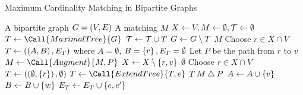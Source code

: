 \begin{algorithm}[!h]
    \caption{Maximum Cardinality Matching in Bipartite Graphs} \label{alg:max_card_match_bipartite}
    \begin{algorithmic}[1]
        \Algin A bipartite graph $G = \left( V, E \right)$
        \Algout A matching $M$ 
        \State $X \gets V, M \gets \emptyset, \mathcal{T} \gets \emptyset$ 
         \label{line:max_card_bi_while}
            \State $T \gets \Call{MaximalTree}{G}$%
            \State $\mathcal{T} \gets \mathcal{T} \cup T$%
            \State $G \gets G \setminus T$ 
        \EndWhile
        \State \Return $M$
        \Statex
            \State Choose $r \in X \cap V$ 
            \State $T \gets \left( \left( A, B \right), E_T \right)$ where $A = \emptyset$, $B = \left\{ r \right\}, E_T = \emptyset$  
                 
                    \State Let $P$ be the path from $r$ to $v$
                    \State $M \gets \Call{Augment}{M, P}$
                    \State $X \gets X \setminus \left\{ r, v \right\}$ 
                        \State \Return $\emptyset$ %
                    \Else 
                        \State Choose $r \in X \cap V$ 
                        \State $T \gets \left( \left( \emptyset, \left\{ r \right\} \right), \emptyset \right)$ 
                    \EndIf
                \Else
                    \State $T \gets \Call{ExtendTree}{T, e}$
                \EndIf
            \EndWhile
            \State \Return $T$ %
        \EndFunction
        \Statex
            \State $ M \bigtriangleup P$
        \EndProcedure
        \Statex
                \State $A \gets A \cup \left\{ v \right\}$
                \State $B \gets B \cup \left\{ w \right\}$    
                \State $E_T \gets E_T \cup \left\{ e, e^\prime \right\}$
            \EndIf
        \EndProcedure
    \end{algorithmic}  
\end{algorithm}

